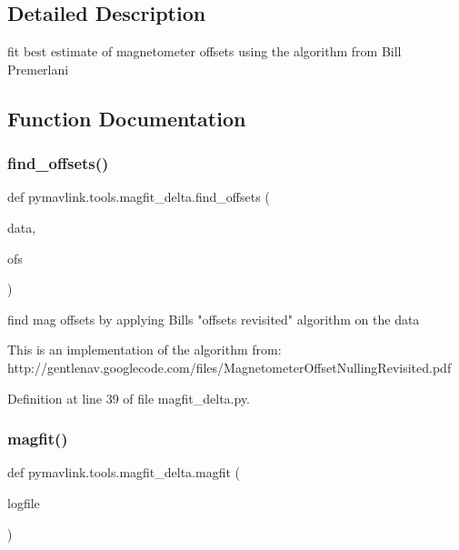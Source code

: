 \subsection{Detailed Description}
\begin{DoxyVerb}fit best estimate of magnetometer offsets using the algorithm from
Bill Premerlani
\end{DoxyVerb}
 

\subsection{Function Documentation}
\mbox{\label{namespacepymavlink_1_1tools_1_1magfit__delta_a9ac6d8af876f202d906aadabe7c39e46}} 
\subsubsection{\texorpdfstring{find\_offsets()}{find\_offsets()}}
{\footnotesize\ttfamily def pymavlink.\+tools.\+magfit\+\_\+delta.\+find\+\_\+offsets (\begin{DoxyParamCaption}\item[{}]{data,  }\item[{}]{ofs }\end{DoxyParamCaption})}

\begin{DoxyVerb}find mag offsets by applying Bills "offsets revisited" algorithm
   on the data

   This is an implementation of the algorithm from:
      http://gentlenav.googlecode.com/files/MagnetometerOffsetNullingRevisited.pdf\end{DoxyVerb}
 

Definition at line 39 of file magfit\+\_\+delta.\+py.

\mbox{\label{namespacepymavlink_1_1tools_1_1magfit__delta_a29df37e1c387e2a17988c9028c7c9b6e}} 
\subsubsection{\texorpdfstring{magfit()}{magfit()}}
{\footnotesize\ttfamily def pymavlink.\+tools.\+magfit\+\_\+delta.\+magfit (\begin{DoxyParamCaption}\item[{}]{logfile }\end{DoxyParamCaption})}


